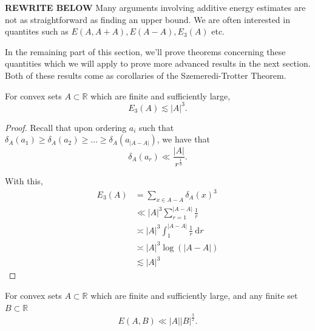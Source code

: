 \documentclass[12pt,reqno]{amsart}
\begin{document}
\textbf{REWRITE BELOW}
Many arguments involving additive energy estimates are not as straightforward
as finding an upper bound. We are often interested in quantites such as 
\(E(A,A + A), E(A - A), E_{3} (A)\) etc.

In the remaining part of this section, we'll prove theorems concerning these quantities
which we will apply to prove more advanced results in the next section. Both of these
results come as corollaries of the Szemeredi-Trotter Theorem.

\begin{theorem}
For convex sets \(A \subset \mathbb{R} \) which are finite and sufficiently large,
\[
    E_{3} (A) \lesssim  \left\lvert A \right\rvert ^{ 3}
.\]
\end{theorem}

\begin{proof}
Recall that upon ordering \(a_{i} \) such that \(\delta_A(a_1) \geq \delta_A(a_2) \geq \dots \geq \delta_{A} (a_{\left\lvert A-A \right\rvert } )\),
we have that
\[
    \delta_{A} (a_{r} ) \ll \frac{\left\lvert A \right\rvert }{r^{\frac{1}{3} }}
.\]

With this,
\begin{align*}
E_3(A) & = \sum _{x \in A-A} \delta_{A} (x)^{3} \\
& \ll \left\lvert A \right\rvert ^{3} \sum_{r=1}^{\left\lvert A-A \right\rvert } \frac{1}{r}\\
& \asymp \left\lvert A \right\rvert ^{3} \int_{1}^{\left\lvert A-A \right\rvert } \frac{1}{r}  ~\mathrm{d} r \\
& \asymp  \left\lvert A \right\rvert ^{3} \log \left( \left\lvert A-A \right\rvert  \right) \\
& \lesssim  \left\lvert A \right\rvert ^{3}
\end{align*}
\end{proof}

\begin{theorem} \label{thm:szt-energy-convex-and-arbitrary}
For convex sets \(A \subset \mathbb{R} \) which are finite and sufficiently large, and any finite set \(B \subset \mathbb{R} \)
\[
    E(A,B) \ll \left\lvert A \right\rvert \left\lvert B \right\rvert ^{\frac{3}{2} }
.\]
\end{theorem}
\end{document}
